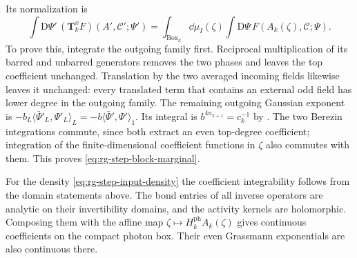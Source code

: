 Its normalization is
\begin{equation}\label{eq:rg-step-block-marginal}
 \int\mathrm D\Psi'\,(\mathbf T_k^xF)(A',\mathscr C';\Psi')
       =\int_{\mathrm{Box}_k}\dd\mu_I(\zeta)
                       \int\mathrm D\Psi\,F(A_k(\zeta),\mathscr C;\Psi).
\end{equation}
To prove this, integrate the outgoing family first.
Reciprocal multiplication of its barred and unbarred
generators removes the two phases and leaves the top
coefficient unchanged. Translation by the two averaged
incoming fields likewise leaves it unchanged: every
translated term that contains an external odd field
has lower degree in the outgoing family.
The remaining outgoing Gaussian exponent is
$-b_L\langle\bar\Psi'_L,\Psi'_L\rangle_L
=-b\langle\bar\Psi',\Psi'\rangle_1$.
Its integral is $b^{4n_{k+1}}=c_k^{-1}$ by
.
The two Berezin integrations commute, since both
extract an even top-degree coefficient; integration
of the finite-dimensional coefficient functions in
$\zeta$ also commutes with them. This proves
\eqref{eq:rg-step-block-marginal}.

For the density \eqref{eq:rg-step-input-density}
the coefficient integrability follows from the domain
statements above. The bond entries of all inverse
operators are analytic on their invertibility domains,
and the activity kernels are holomorphic. Composing
them with the affine map $\zeta\mapsto
H_k^{\mathrm{ph}}A_k(\zeta)$ gives continuous
coefficients on the compact photon box. Their even
Grassmann exponentials are also continuous there.

